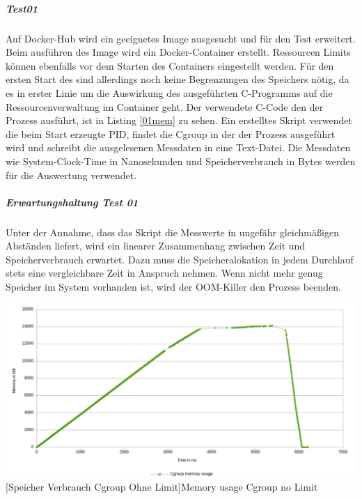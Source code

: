 \subparagraph{Test01}
Auf Docker-Hub wird ein geeignetes Image ausgesucht und für den Test erweitert. Beim ausführen des Image wird ein Docker-Container erstellt. Ressourcen Limits können ebenfalls vor dem Starten des Containers eingestellt werden. Für den ersten Start des sind allerdings noch keine Begrenzungen des Speichers nötig, da es in erster Linie um die Auswirkung des ausgeführten C-Programms auf die Ressourcenverwaltung im Container geht. Der verwendete C-Code den der Prozess ausführt, ist in Listing \ref{01mem} zu sehen. Ein erstelltes Skript verwendet die beim Start erzeugte PID, findet die Cgroup in der der Prozess ausgeführt wird und schreibt die ausgelesenen Messdaten in eine Text-Datei. Die Messdaten wie System-Clock-Time in Nanosekunden und Speicherverbrauch in Bytes werden für die Auswertung verwendet.


\vspace{1em}


\subparagraph{Erwartungshaltung Test 01}
Unter der Annahme, dass das Skript die Messwerte in ungefähr gleichmäßigen Abständen liefert, wird ein linearer Zusammenhang zwischen Zeit und Speicherverbrauch erwartet. Dazu muss die Speicheralokation in jedem Durchlauf stets eine vergleichbare Zeit in Anspruch nehmen. Wenn nicht mehr genug Speicher im System vorhanden ist, wird der OOM-Killer den Prozess beenden.

\vspace{2em}
\begin{minipage}{\linewidth}
	\centering
	\includegraphics[width=1\linewidth]{pics/001_mem_usage_No_Limit_Cgroup_RDY_FOR_USE.png}
	[Speicher Verbrauch Cgroup Ohne Limit]{Memory usage Cgroup no Limit}
	\label{fig:001_mem_usage_No_Limit_Cgroup_RDY_FOR_USE}
\end{minipage}


